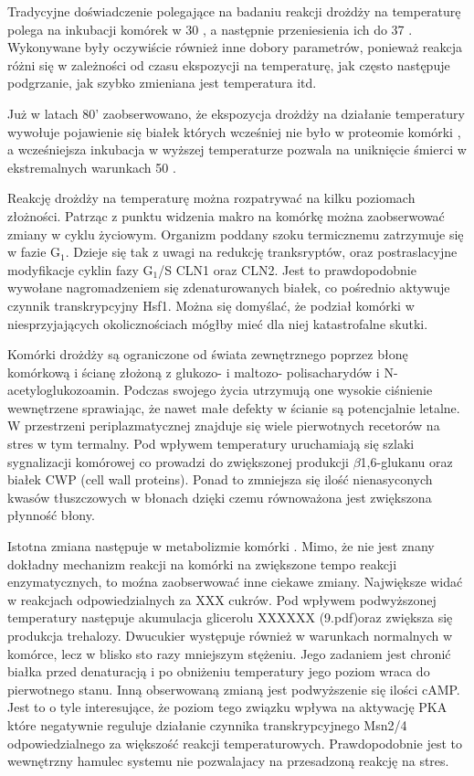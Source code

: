 \documentclass{pracamgr}
\begin{document}
Tradycyjne doświadczenie polegające na badaniu reakcji drożdży na temperaturę polega na inkubacji komórek w 30 \textcelsius, a
następnie przeniesienia ich do 37 \textcelsius. Wykonywane były oczywiście również inne dobory parametrów, ponieważ 
reakcja różni się w zależności od czasu ekspozycji na temperaturę, jak często następuje podgrzanie, jak szybko zmieniana
jest temperatura itd.

Już w latach 80' zaobserwowano, że ekspozycja drożdży na działanie temperatury wywołuje pojawienie się białek których 
wcześniej nie było w proteomie komórki \cite{Miller1979}, a wcześniejsza inkubacja w wyższej temperaturze pozwala 
na uniknięcie śmierci w ekstremalnych warunkach 50 \textcelsius \cite{Mcalister1980}.

Reakcję drożdży na temperaturę można rozpatrywać na kilku poziomach złożności. Patrząc z punktu widzenia makro na komórkę
można zaobserwować zmiany w cyklu życiowym. Organizm poddany szoku termicznemu zatrzymuje się w fazie G$_1$. Dzieje się tak 
z uwagi na redukcję tranksryptów, oraz postraslacyjne modyfikacje cyklin fazy G$_1$/S CLN1 oraz CLN2\cite{CyclinArrest}. Jest to prawdopodobnie
wywołane nagromadzeniem się zdenaturowanych białek, co pośrednio aktywuje czynnik transkrypcyjny Hsf1\cite{MisfoldedProteins}. Można się domyślać, że 
podział komórki w niesprzyjających okolicznościach mógłby mieć dla niej katastrofalne skutki.	

Komórki drożdży są ograniczone od świata zewnętrznego poprzez błonę komórkową i ścianę złożoną z glukozo- i maltozo- polisacharydów
 i N-acetyloglukozoamin. Podczas swojego życia utrzymują one wysokie ciśnienie wewnętrzene sprawiając, że nawet małe defekty w ścianie 
 są potencjalnie letalne. W przestrzeni periplazmatycznej znajduje się wiele pierwotnych recetorów na stres w tym termalny. 
 Pod wpływem temperatury uruchamiają się szlaki sygnalizacji komórowej co prowadzi do zwiększonej produkcji $\beta$1,6-glukanu
 oraz białek CWP (cell wall proteins)\cite{CellWall}. Ponad to zmniejsza się ilość nienasyconych kwasów tłuszczowych w błonach \cite{CellLipids}
 dzięki czemu równoważona jest zwiększona płynność błony.
 
 Istotna zmiana następuje w metabolizmie komórki
 . Mimo, że nie jest znany dokładny mechanizm reakcji na komórki na zwiększone 
 tempo reakcji enzymatycznych, to moźna zaobserwować inne ciekawe zmiany. Największe widać w reakcjach odpowiedzialnych za
 XXX cukrów. Pod wpływem podwyższonej temperatury następuje akumulacja glicerolu \cite{GlycerolAccumulate} XXXXXX (9.pdf)oraz
 zwiększa się produkcja trehalozy. Dwucukier występuje również w warunkach normalnych w komórce, lecz w blisko sto razy mniejszym stężeniu. 
 Jego zadaniem jest chronić białka przed denaturacją i po obniżeniu temperatury jego poziom wraca do pierwotnego stanu. Inną obserwowaną
 zmianą jest podwyższenie się ilości cAMP. Jest to o tyle interesujące, że poziom tego związku wpływa na aktywację PKA które negatywnie
 reguluje działanie czynnika transkrypcyjnego Msn2/4 odpowiedzialnego za większość reakcji temperaturowych. Prawdopodobnie 
 jest to wewnętrzny hamulec systemu nie pozwalajacy na przesadzoną reakcję na stres\cite{Blomberg00,StressResponse99}.
\end{document}
